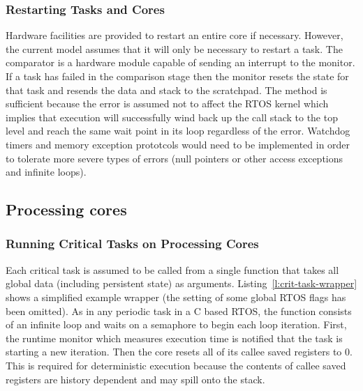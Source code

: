 \subsubsection{Restarting Tasks and Cores}

	Hardware facilities are provided to restart an entire core if necessary. 
	However, the current model assumes that it will only be necessary to restart a task.
	The comparator is a hardware module capable of sending an interrupt to the monitor. 
	If a task has failed in the comparison stage then the monitor resets the state for that task and resends the data and stack to the scratchpad.
	The method is sufficient because the error is assumed not to affect the RTOS kernel which implies that execution will successfully wind back up the call stack to the top level and reach the same wait point in its loop regardless of the error.
	Watchdog timers and memory exception prototcols would need to be implemented in order to tolerate more severe types of errors (null pointers or other access exceptions and infinite loops).



\subsection{Processing cores}
\label{s:proc-cores}
\subsubsection{Running Critical Tasks on Processing Cores}

\label{s:pcores}
	Each critical task is assumed to be called from a single function that takes all global data (including persistent state) as arguments. 
	Listing~\ref{l:crit-task-wrapper} shows a simplified example wrapper (the setting of some global RTOS flags has been omitted). 
	As in any periodic task in a C based RTOS, the function consists of an infinite loop and waits on a semaphore to begin each loop iteration. 
	First, the runtime monitor which measures execution time is notified that the task is starting a new iteration. 
	Then the core resets all of its callee saved registers to 0. 
	This is required for deterministic execution because the contents of callee saved registers are history dependent and may spill onto the stack. 

